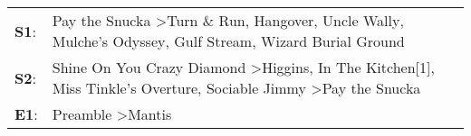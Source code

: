 \begin{supertabular}{p{0.03\textwidth}p{0.92\textwidth}}
 \textbf{S1}:  &  Pay the Snucka\textsuperscript{} \textgreater \enspace Turn \& Run\textsuperscript{}, \enspace Hangover\textsuperscript{}, \enspace Uncle Wally\textsuperscript{}, \enspace Mulche's Odyssey\textsuperscript{}, \enspace Gulf Stream\textsuperscript{}, \enspace Wizard Burial Ground\textsuperscript{}  \enspace  \\
 \textbf{S2}:  &          Shine On You Crazy Diamond\textsuperscript{} \textgreater \enspace Higgins\textsuperscript{}, \enspace In The Kitchen[1]\textsuperscript{}, \enspace Miss Tinkle's Overture\textsuperscript{}, \enspace Sociable Jimmy\textsuperscript{} \textgreater \enspace Pay the Snucka\textsuperscript{}  \enspace  \\
 \textbf{E1}:  &                                                                                                                                                                                                                                Preamble\textsuperscript{} \textgreater \enspace Mantis\textsuperscript{}  \enspace  \\
\end{supertabular}
